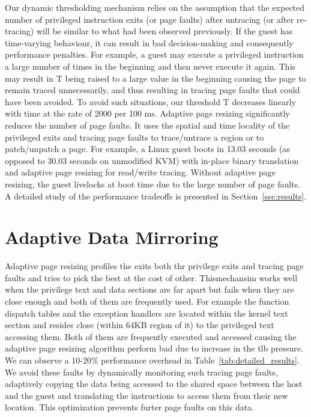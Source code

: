 Our dynamic thresholding mechanism relies on the assumption that the expected number of privileged instruction exits (or page faults) after  untracing (or after re-tracing) will be similar to what had been observed previously. If the guest has time-varying behaviour, it can result in bad decision-making and consequently performance penalties. For example, a guest may execute a privileged instruction a large number of times in the beginning and then never execute it again. This may result in T being raised to a large value in the beginning causing the page to remain traced unnecessarily, and thus resulting in tracing page faults that could have been avoided. To avoid such situations, our threshold T decreases linearly with time at the rate of 2000 per 100 ms. 
Adaptive page resizing significantly reduces the number of page faults. It uses the spatial and time locality of the privileged exits and tracing page faults to trace/untrace a region or to patch/unpatch a page. For example, a Linux guest boots in 13.03 seconds (as opposed to 30.03 seconds on unmodified KVM) with in-place binary translation and adaptive page resizing for read/write tracing. Without adaptive page resizing, the guest livelocks at boot time due to the large number of page faults. A detailed study of the performance tradeoffs is presented in Section~\ref{sec:results}.

\section{Adaptive Data Mirroring}
\label{adaptive_dm}
Adaptive page resizing profiles the exits both thr privilege exits and tracing page faults and tries to pick the best at the cost of other. Thismechansim works well when the privilege text and data sections are far apart but fails when they are close enough and both of them are frequently used. For example the function dispatch tables and the exception handlers are located within the kernel text section and resides close (within 64KB region of it) to the privileged text accessing them. Both of them are frequently executed and accessed causing the adaptive page resizing algorithm perform bad due to increase in the tlb pressure. We can observe a 10-20\% performance overhead in Table~\ref{tab:detailed_results}. 
We avoid these faults by dynamically monitoring such tracing page faults, adaptively copying the data being accessed to the shared space between the host and the guest and translating the instructions to access them from their new location. This optimization prevents furter page faults on this data. 


